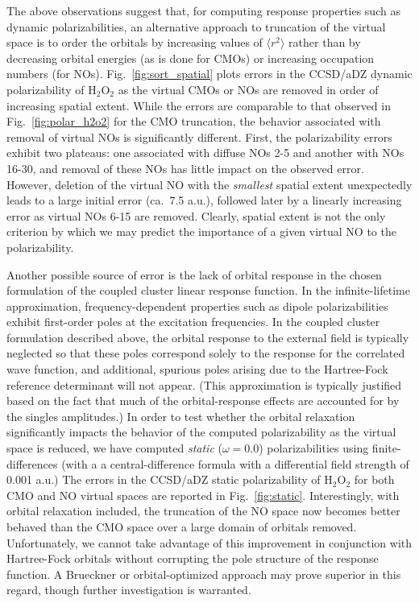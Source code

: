 \documentclass[journal=jpccck,manuscript=article]{achemso}
\begin{document}
The above observations suggest that, for computing response properties such as
dynamic polarizabilities, an alternative approach to truncation of the virtual
space is to order the orbitals by increasing values of $\langle r^2 \rangle$
rather than by decreasing orbital energies (as is done for CMOs) or increasing
occupation numbers (for NOs).  Fig.~\ref{fig:sort_spatial} plots errors in the
CCSD/aDZ dynamic polarizability of H$_2$O$_2$ as the virtual CMOs or NOs are
removed in order of increasing spatial extent.  While the errors are
comparable to that observed in Fig.~\ref{fig:polar_h2o2} for the CMO
truncation, the behavior associated with removal of virtual NOs is
significantly different.  First, the polarizability errors exhibit two
plateaus: one associated with diffuse NOs 2-5 and another with NOs 16-30, and
removal of these NOs has little impact on the observed error.  However,
deletion of the virtual NO with the {\em smallest} spatial extent unexpectedly
leads to a large initial error (ca.\ 7.5 a.u.), followed later by a linearly
increasing error as virtual NOs 6-15 are removed.  Clearly, spatial extent is
not the only criterion by which we may predict the importance of a given
virtual NO to the polarizability.

Another possible source of error is the lack of orbital response in the chosen
formulation of the coupled cluster linear response function.\cite{Koch94:BCC}
In the infinite-lifetime approximation, frequency-dependent properties such as
dipole polarizabilities exhibit first-order poles at the excitation
frequencies.  In the coupled cluster formulation described above, the orbital
response to the external field is typically neglected so that these poles
correspond solely to the response for the correlated wave function, and
additional, spurious poles arising due to the Hartree-Fock reference
determinant will not appear.  (This approximation is typically justified based
on the fact that much of the orbital-response effects are accounted for by the
singles amplitudes.\cite{Christiansen95:CC2})  In order to test whether the
orbital relaxation significantly impacts the behavior of the computed
polarizability as the virtual space is reduced, we have computed {\em static}
($\omega = 0.0$) polarizabilities using finite-differences (with a a
central-difference formula with a differential field strength of 0.001 a.u.)
The errors in the CCSD/aDZ static polarizability of H$_2$O$_2$ for both CMO
and NO virtual spaces are reported in Fig.~\ref{fig:static}.  Interestingly,
with orbital relaxation included, the truncation of the NO space now becomes
better behaved than the CMO space over a large domain of orbitals removed.
Unfortunately, we cannot take advantage of this improvement in conjunction
with Hartree-Fock orbitals without corrupting the pole structure of the
response function.  A Brueckner or orbital-optimized approach may prove
superior in this regard, though further investigation is
warranted.\cite{Koch94:BCC,Pedersen01}
\end{document}
